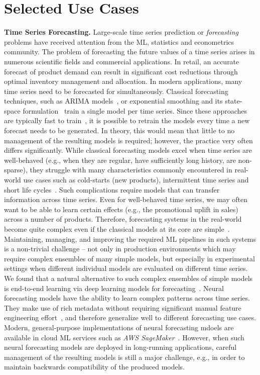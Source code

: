 \documentclass[11pt]{article}
\newcommand{\hdr}[1]{\noindent\textbf{#1.}}
\begin{document}
\section{Selected Use Cases}
\label{sec:usecases}

\hdr{Time Series Forecasting} Large-scale time series prediction or \emph{forecasting} problems have received attention from the ML, statistics and econometrics community. The problem of forecasting the future values of a time series arises in numerous scientific fields and commercial applications. In retail, an accurate forecast of product demand can result in significant cost reductions through optimal inventory management and allocation. In modern applications, many time series need to be forecasted for simultaneously. Classical forecasting techniques, such as ARIMA models~\cite{Box2015time}, or exponential smoothing and its state-space formulation~\cite{Hyndman2008forecasting} train a single model per time series.
%
Since these approaches are typically fast to train~\cite{taylor2017forecasting,hyndman2007automatic}, it is possible to retrain the models every time a new forecast needs to be generated. In theory, this would mean that little to no management of the resulting models is required; however, the practice very often differs significantly. While classical forecasting models excel when time series are well-behaved (e.g., when they are regular, have sufficiently long history, are non-sparse), they struggle with many characteristics commonly encountered in real-world use cases such as cold-starts (new products), intermittent time series and short life cycles~\cite{Seeger2016bayesian}. Such complications require models that can transfer information across time series. Even for well-behaved time series, we may often want to be able to learn certain effects (e.g., the promotional uplift in sales) across a number of products. Therefore, forecasting systems in the real-world become quite complex even if the classical models at its core are simple~\cite{Bose2017}. Maintaining, managing, and improving the required ML pipelines in such systems is a non-trivial challenge -- not only in production environments which may require complex ensembles of many simple models, but especially in experimental settings when different individual models are evaluated on different time series. 
%
We found that a natural alternative to such complex ensembles of simple models is end-to-end learning via deep learning models for forecasting~\cite{Faloutsos2018}. Neural forecasting models have the ability to learn complex patterns across time series. They make use of rich metadata without requiring significant manual feature engineering effort~\cite{Flunkert2017}, and therefore generalize well to different forecasting use cases. Modern, general-purpose implementations of neural forecasting mdoels are available in cloud ML services such as \textit{AWS SageMaker}~\cite{janu2018}. However, when such neural forecasting models are deployed in long-running applications, careful management of the resulting models is still a major challenge, e.g., in order to maintain backwards compatibility of the produced models.\\
\end{document}
